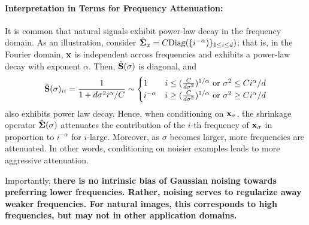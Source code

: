 \paragraph{Interpretation in Terms for Frequency Attenuation:} It is common that natural signals exhibit power-law decay in the frequency domain. As an illustration, consider  $\hat {\bm{\Sigma}}_x = C \mathrm{Diag}(\{i^{-\alpha})\}_{1 \le i \le d})$; that is, in the Fourier domain, ${\mathbf{x}}$ is independent across frequencies and exhibits a power-law decay with exponent $\alpha$. Then, $\hat {\mathbf{S}}(\sigma)$ is diagonal, and 
\begin{align*}
\hat {\mathbf{S}}(\sigma)_{ii} = \frac{1}{1 + d\sigma^2 i^{\alpha}/C} \sim \begin{cases} 1 & i \le (\frac{C}{d\sigma^2})^{1/\alpha}  \text{ or } \sigma^2 \le Ci^{\alpha}/d\\
 i^{-\alpha}  & i \ge (\frac{C}{d\sigma^2})^{1/\alpha} \text{ or } \sigma^2 \ge Ci^{\alpha}/d\\
\end{cases}
\end{align*}
also exhibits power law decay. Hence, when conditioning on ${\mathbf{x}}_{\sigma}$, the shrinkage operator $\hat {\bm{\Sigma}}(\sigma)$ attenuates the contribution of the $i$-th frequency of ${\mathbf{x}}_{\sigma}$ in proportion to $i^{-\alpha}$ for $i$-large. Moreover, as $\sigma$ becomes larger, more frequencies are attenuated. In other words, conditioning on noisier examples leads to more aggressive attenuation.

Importantly, \textbf{there is no intrinsic bias of Gaussian noising towards preferring lower frequencies. Rather, noising serves to regularize away weaker frequencies. For natural images, this corresponds to high frequencies, but may not in other application domains.}


